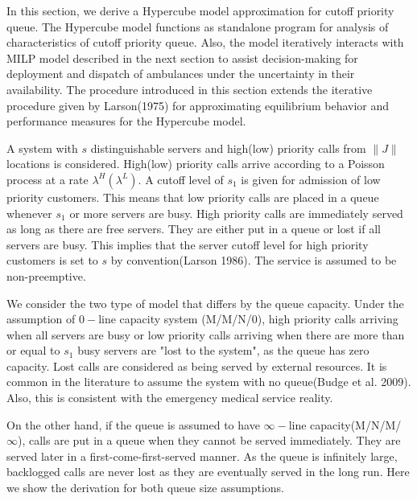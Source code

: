 \documentclass{article}
\begin{document}
In this section, we derive a Hypercube model approximation for cutoff priority queue. The Hypercube model functions as standalone program for analysis of characteristics of cutoff priority queue. Also, the model iteratively interacts with MILP model described in the next section to assist decision-making for deployment and dispatch of ambulances under the uncertainty in their availability. The procedure introduced in this section extends the iterative procedure given by Larson(1975) for approximating equilibrium behavior and performance measures for the Hypercube model. 

A system with $s$ distinguishable servers and high(low) priority calls from $\|J\|$ locations is considered. High(low) priority calls arrive according to a Poisson process at a rate $\lambda^H(\lambda^L)$. A cutoff level of $s_1$ is given for admission of low priority customers. This means that low priority calls are placed in a queue whenever $s_1$ or more servers are busy. High priority calls are immediately served as long as there are free servers. They are either put in a queue or lost if all servers are busy. This implies that the server cutoff level for high priority customers is set to $s$ by convention(Larson 1986). The service is assumed to be non-preemptive.

We consider the two type of model that differs by the queue capacity. Under the assumption of $0-$line capacity system (M/M/N/$0$), high priority calls arriving when all servers are busy or low priority calls arriving when there are more than or equal to $s_1$ busy servers are "lost to the system", as the queue has zero capacity. Lost calls are considered as being served by external resources. It is common in the literature to assume the system with no queue(Budge et al. 2009). Also, this is consistent with the emergency medical service reality.

On the other hand, if the queue is assumed to have $\infty-$line capacity(M/N/M/$\infty$), calls are put in a queue when they cannot be served immediately. They are served later in a first-come-first-served manner. As the queue is infinitely large, backlogged calls are never lost as they are eventually served in the long run. Here we show the derivation for both queue size assumptions. 
\end{document}
